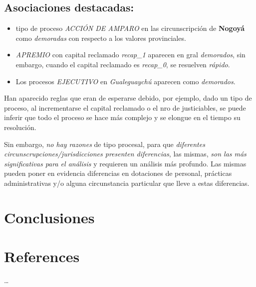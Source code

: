 \documentclass[runningheads,a4paper]{llncs}
\def\tightlist{} %
\begin{document}
\subsection{Asociaciones destacadas:}\label{asociaciones-destacadas}

\begin{itemize}
\tightlist
\item
  tipo de proceso \emph{ACCIÓN DE AMPARO} en las circunscripción de
  \textbf{Nogoyá} como \emph{demoradas} con respecto a los valores
  provinciales.
\item
  \emph{APREMIO} con capital reclamado \emph{recap\_1} aparecen en gral
  \emph{demorados}, sin embargo, cuando el capital reclamado es
  \emph{recap\_0}, se resuelven \emph{rápido}.
\item
  Los procesos \emph{EJECUTIVO} en \emph{Gualeguaychú} aparecen como
  \emph{demorados}.
\end{itemize}

Han aparecido reglas que eran de esperarse debido, por ejemplo, dado un
tipo de proceso, al incrementarse el capital reclamado o el nro de
justiciables, se puede inferir que todo el proceso se hace más complejo
y se elongue en el tiempo su resolución.

Sin embargo, \emph{no hay razones} de tipo procesal, para que
\emph{diferentes circunscrupciones/jurisdicciones presenten
diferencias}, las mismas, \emph{son las más significativas para el
análisis} y requieren un análisis más profundo. Las mismas pueden poner
en evidencia diferencias en dotaciones de personal, prácticas
administrativas y/o alguna circunstancia particular que lleve a estas
diferencias.

\section{Conclusiones}\label{conclusiones}

\section{References}\label{references}

\ldots{}
\end{document}
